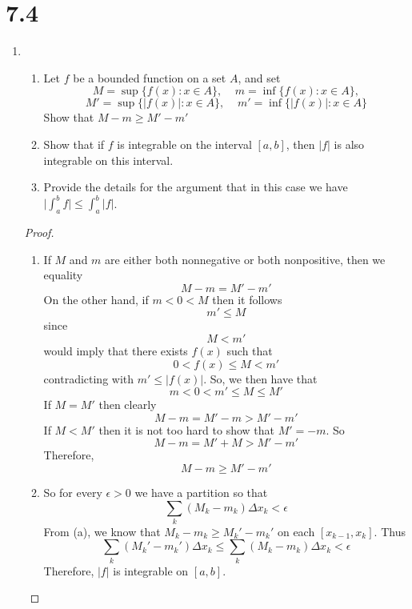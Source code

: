 \section*{7.4}
\begin{enumerate}
    \item \begin{enumerate}
        \item Let \( f \) be a bounded function on a set \( A \), and set 
        \[
        M = \sup\{ f(x): x \in A \}, \;\;\;\; m = \inf\{ f(x): x \in A \},
        \]
        \[
        M' = \sup \{ \vert f(x) \vert: x \in A \}, \;\;\;\; m' = \inf\{ \vert f(x) \vert : x \in A \}
        \]
        Show that \( M-m \geq M'-m' \)
        
        \item Show that if \( f \) is integrable on the interval \( [a,b] \), then \( \vert f \vert \) is also integrable on this interval.
        
        \item Provide the details for the argument that in this case we have \( \vert \int_{a}^{b} f \vert \leq \int_{a}^{b} \vert f \vert \).
    \end{enumerate}
    
    \begin{proof}
    \begin{enumerate}
        \item If \(M \) and \( m \) are either both nonnegative or both nonpositive, then we equality
        \[
        M-m = M'-m'
        \]
        On the other hand, if \( m < 0 < M \) then it follows 
        \[
        m' \leq M
        \]
        since
        \[
        M < m'
        \]
        would imply that there exists \( f(x) \) such that
        \[
        0 < f(x) \leq M < m'
        \]
        contradicting with \( m' \leq \vert f(x) \vert \). So, we then have that
        \[
        m < 0 < m' \leq M \leq M'
        \]
        If \( M = M' \) then clearly
        \[
        M-m = M' - m > M' - m'
        \]
        If \( M < M' \) then it is not too hard to show that \( M' = -m \). So
        \[
        M-m = M'+ M > M' - m' 
        \]
        Therefore,
        \[
        M-m \geq M'-m'
        \]
        
        \item So for every \( \epsilon > 0 \) we have a partition so that
        \[
        \sum_k (M_k - m_k) \Delta x_k < \epsilon
        \]
        From (a), we know that \( M_k - m_k \geq M_k'-m_k' \) on each \( [x_{k-1},x_k] \). Thus
        \[
        \sum_k (M_k'-m_k')\Delta x_k \leq \sum_k (M_k - m_k) \Delta x_k < \epsilon
        \]
        Therefore, \( \vert f \vert \) is integrable on \( [a,b] \).
        

\end{enumerate}
\end{proof}
\end{enumerate}
